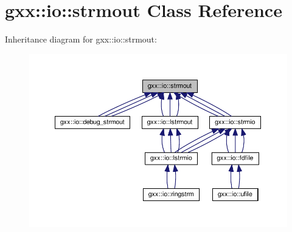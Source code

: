 \hypertarget{classgxx_1_1io_1_1strmout}{}\section{gxx\+:\+:io\+:\+:strmout Class Reference}
\label{classgxx_1_1io_1_1strmout}


Inheritance diagram for gxx\+:\+:io\+:\+:strmout\+:
\nopagebreak
\begin{figure}[H]
\begin{center}
\leavevmode
\includegraphics[width=350pt]{classgxx_1_1io_1_1strmout__inherit__graph}
\end{center}
\end{figure}
